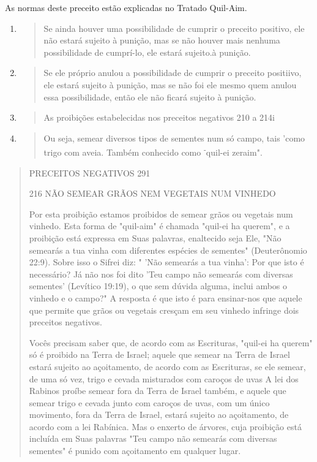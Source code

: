As normas deste preceito estão explicadas no Tratado Quil-Aim.

\begin{enumerate}
\def\labelenumi{\arabic{enumi}.}
\setcounter{enumi}{384}
\item
  \begin{quote}
  Se ainda houver uma possibilidade de cumprir o preceito positivo, ele
  não estará sujeito à punição, mas se não houver mais nenhuma
  possibilidade de cumprí-lo, ele estará sujeito.à punição.
  \end{quote}
\item
  \begin{quote}
  Se ele próprio anulou a possibilidade de cumprir o preceito positiivo,
  ele estará sujeito à puni­ção, mas se não foi ele mesmo quem anulou
  essa possibilidade, então ele não ficará sujeito à punição.
  \end{quote}
\item
  \begin{quote}
  As proibições estabelecidas nos preceitos negativos 210 a 214i
  \end{quote}
\item
  \begin{quote}
  Ou seja, semear diversos tipos de sementes num só campo, tais 'como
  trigo com aveia. Tam­bém conhecido como \textsuperscript{-}quil-ei
  zeraim".
  \end{quote}
\end{enumerate}

\begin{quote}
PRECEITOS NEGATIVOS 291

216 NÃO SEMEAR GRÃOS NEM VEGETAIS NUM VINHEDO

Por esta proibição estamos proibidos de semear grãos ou vegetais num
vinhedo. Esta forma de "quil-aim" é chamada "quil-ei ha querem", e a
proibição está expressa em Suas palavras, enaltecido seja Ele, "Não
semearás a tua vinha com diferentes espécies de sementes" (Deuterônomio
22:9). Sobre isso o Sifrei diz: " 'Não semearás a tua vinha': Por que
isto é necessário? Já não nos foi dito 'Teu campo não semearás com
diversas sementes' (Levítico 19:19), o que sem dúvida alguma, inclui
ambos o vinhedo e o campo?" A resposta é que isto é para ensinar-nos que
aquele que permite que grãos ou vegetais cres­çam em seu vinhedo
infringe dois preceitos negativos.

Vocês precisam saber que, de acordo com as Escrituras, "quil-ei ha
querem" só é proibido na Terra de Israel; aquele que semear na Terra de
Israel estará sujeito ao açoitamento, de acordo com as Escrituras, se
ele semear, de uma só vez, trigo e cevada misturados com caroços de uvas
A lei dos Rabinos proíbe semear fora da Terra de Israel também, e aquele
que semear trigo e ce­vada junto com caroços de uvas, com um único
movimento, fora da Terra de Israel, estará sujeito ao açoitamento, de
acordo com a lei Rabínica. Mas o en­xerto de árvores, cuja proibição
está incluída em Suas palavras "Teu campo não semearás com diversas
sementes" é punido com açoitamento em qualquer lugar.
\end{quote}

